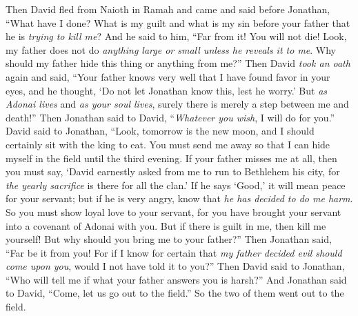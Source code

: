 \begin{biblechapter} %
 Then David fled from Naioth in Ramah and came and said before Jonathan, “What have I done? What is my guilt and what is my sin before your father that he is \textit{trying to kill me}?
\verse And he said to him, “Far from it! You will not die! Look, my father does not do \textit{anything large or small unless he reveals it to me}. Why should my father hide this thing or anything from me?”
\verse Then David \textit{took an oath} again and said, “Your father knows very well that I have found favor in your eyes, and he thought, ‘Do not let Jonathan know this, lest he worry.’ But \textit{as Adonai lives} and \textit{as your soul lives}, surely there is merely a step between me and death!”
\verse Then Jonathan said to David, “\textit{Whatever you wish}, I will do for you.”
\verse David said to Jonathan, “Look, tomorrow is the new moon, and I should certainly sit with the king to eat. You must send me away so that I can hide myself in the field until the third evening.
\verse If your father misses me at all, then you must say, ‘David earnestly asked from me to run to Bethlehem his city, for \textit{the yearly sacrifice} is there for all the clan.’
\verse If he says ‘Good,’ it will mean peace for your servant; but if he is very angry, know that \textit{he has decided to do me harm}.
\verse So you must show loyal love to your servant, for you have brought your servant into a covenant of Adonai with you. But if there is guilt in me, then kill me yourself! But why should you bring me to your father?”
\verse Then Jonathan said, “Far be it from you! For if I know for certain that \textit{my father decided evil should come upon you}, would I not have told it to you?”
\verse Then David said to Jonathan, “Who will tell me if what your father answers you is harsh?”
\verse And Jonathan said to David, “Come, let us go out to the field.” So the two of them went out to the field.

\end{biblechapter}
